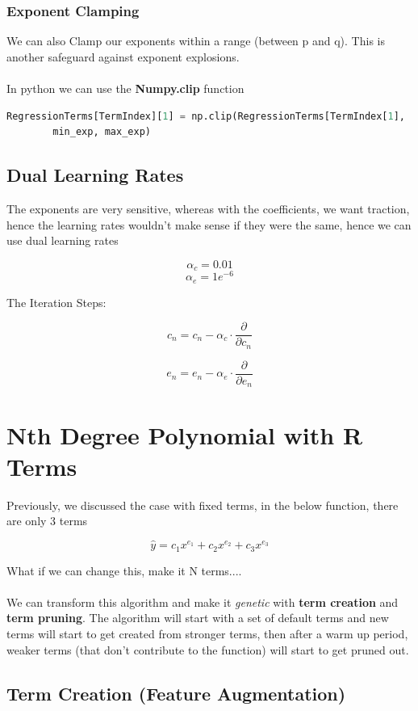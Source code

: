\documentclass[11pt]{article}
\begin{document}
\subsubsection{Exponent Clamping}

We can also Clamp our exponents within a range (between p and q). This is another safeguard against exponent explosions. \\\\In python we can use the \textbf{Numpy.clip} function

\begin{lstlisting}[language=Python]
        RegressionTerms[TermIndex][1] = np.clip(RegressionTerms[TermIndex[1], 
        min_exp, max_exp)
\end{lstlisting}

\subsection{Dual Learning Rates}
The exponents are very sensitive, whereas with the coefficients, we want traction, hence the learning rates wouldn't make sense if they were the same, hence we can use dual learning rates

\[
\alpha_c = 0.01
\]
\[
\alpha_e = 1e^{-6}
\]

The Iteration Steps:

\[c_n = c_n - \alpha_c \cdot \frac{\partial}{\partial c_n}\]

\[e_n = e_n - \alpha_e \cdot \frac{\partial}{\partial e_n}\]

\newpage

\section{Nth Degree Polynomial with R Terms}
Previously, we discussed the case with fixed terms, in the below function, there are only 3 terms

\[
\hat{y} = c_1x^{e_1} + c_2x^{e_2} + c_3x^{e_3}
\]

What if we can change this, make it N terms....\\\\We can transform this algorithm and make it \textit{genetic} with \textbf{term creation} and \textbf{term pruning}. The algorithm will start with a set of default terms and new terms will start to get created from stronger terms, then after a warm up period, weaker terms (that don't contribute to the function) will start to get pruned out.

\subsection{Term Creation (Feature Augmentation)}
\end{document}
